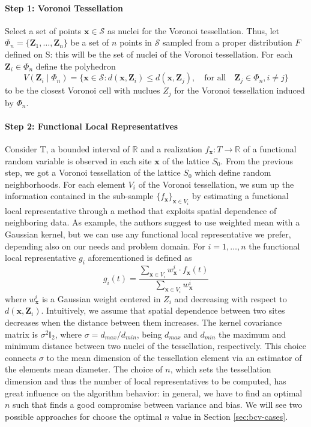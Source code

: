 \paragraph{Step 1: Voronoi Tessellation} Select a set of points $\mathbf{x}\in\mathcal{S}$ as nuclei for the Voronoi tessellation. Thus, let $\Phi_n=\{\mathbf{Z}_1, \dots, \mathbf{Z}_n\}$ be a set of $n$ points in $\mathcal{S}$ sampled from a proper distribution $F$ defined on S: this will be the set of nuclei of the Voronoi tessellation. For each $\mathbf{Z}_i\in\Phi_n$ define the polyhedron
\begin{equation}
    \label{eq:polyedron}
    V\left(\mathbf{Z}_i \mid \Phi_n\right)=\{\mathbf{x}\in\mathcal{S} : d\left(\mathbf{x},\mathbf{Z}_i\right) \leq d\left(\mathbf{x}, \mathbf{Z}_j\right), \quad \text{for all}\quad \mathbf{Z}_j \in \Phi_n, i\neq j\}
\end{equation}
to be the closest Voronoi cell with nuclues $Z_j$ for the Voronoi tessellation induced by $\Phi_n$.
\paragraph{Step 2: Functional Local Representatives} Consider T, a bounded interval of $\mathbb{R}$ and a realization $f_{\mathbf{x}}:T\rightarrow \mathbb{R}$ of a functional random variable is observed in each site $\mathbf{x}$ of the lattice $S_0$. From the previous step, we got a Voronoi tessellation of the lattice $S_0$ which define random neighborhoods. For each element $V_i$ of the Voronoi tessellation, we sum up the information contained in the sub-sample $\{f_{\mathbf{x}}\}_{\mathbf{x} \in V_i}$ by estimating a functional local representative through a method that exploits spatial dependence of neighboring data. As example, the authors suggest to use weighted mean with a Gaussian kernel, but we can use any functional local representative we prefer, depending also on our needs and problem domain. For $i=1, \dots, n$ the functional local representative $g_i$ aforementioned is defined as
\begin{equation}
    \label{eq:gaussianmean}
    g_i(t)=\frac{\sum_{\mathbf{x}\in V_i}w^i_{\mathbf{x}}\cdot f_{\mathbf{x}}(t)}{\sum_{\mathbf{x}\in V_i}w^i_{\mathbf{x}}}
\end{equation}
where $w_{\mathbf{x}}^i$ is a Gaussian weight centered in $Z_i$ and decreasing with respect to $d\left(\mathbf{x}, \mathbf{Z}_i\right)$. Intuitively, we assume that spatial dependence between two sites decreases when the distance between them increases. The kernel covariance matrix is $\sigma^2\mathbb{I}_2$, where $\sigma=d_{max}/d_{min}$, being $d_{max}$ and $d_{min}$ the maximum and minimum distance between two nuclei of the tessellation, respectively. This choice connects $\sigma$ to the mean dimension of the tessellation element via an estimator of the elements mean diameter. The choice of $n$, which sets the tessellation dimension and thus the number of local representatives to be computed, has great influence on the algorithm behavior: in general, we have to find an optimal $n$ such that finds a good compromise between variance and bias. We will see two possible approaches for choose the optimal $n$ value in Section \ref{sec:bcv-cases}.

